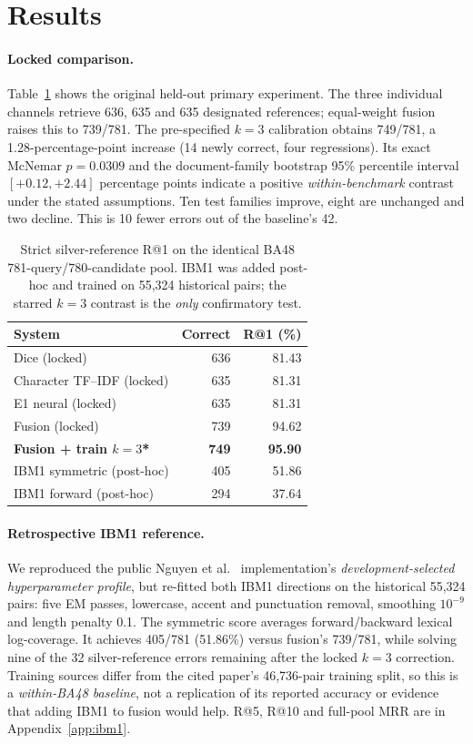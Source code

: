 \section{Results}\label{sec:results}
\paragraph{Locked comparison.} Table~\ref{tab:primary} shows the original held-out primary experiment. The three individual channels retrieve 636, 635 and 635 designated references; equal-weight fusion raises this to 739/781. The pre-specified $k=3$ calibration obtains 749/781, a 1.28-percentage-point increase (14 newly correct, four regressions). Its exact McNemar $p=0.0309$ and the document-family bootstrap 95\% percentile interval $[+0.12,+2.44]$ percentage points indicate a positive \emph{within-benchmark} contrast under the stated assumptions. Ten test families improve, eight are unchanged and two decline. This is 10 fewer errors out of the baseline's 42.

\begin{table}[t]
\centering\small
\caption{Strict silver-reference R@1 on the identical BA48 781-query/780-candidate pool. IBM1 was added post-hoc and trained on 55,324 historical pairs; the starred $k=3$ contrast is the \emph{only} confirmatory test.}
\label{tab:primary}
\begin{tabular}{lrr}
\toprule
System & Correct & R@1 (\%) \\
\midrule
Dice (locked) & 636 & 81.43 \\
Character TF--IDF (locked) & 635 & 81.31 \\
E1 neural (locked) & 635 & 81.31 \\
Fusion (locked) & 739 & 94.62 \\
\textbf{Fusion + train $k=3$*} & \textbf{749} & \textbf{95.90} \\
\midrule
IBM1 symmetric (post-hoc) & 405 & 51.86 \\
IBM1 forward (post-hoc) & 294 & 37.64 \\
\bottomrule
\end{tabular}
\end{table}

\paragraph{Retrospective IBM1 reference.} We reproduced the public Nguyen et al.~\cite{nguyen2026parallelretrieval} implementation's \emph{development-selected hyperparameter profile}, but re-fitted both IBM1 directions on the historical 55,324 pairs: five EM passes, lowercase, accent and punctuation removal, smoothing $10^{-9}$ and length penalty 0.1. The symmetric score averages forward/backward lexical log-coverage. It achieves 405/781 (51.86\%) versus fusion's 739/781, while solving nine of the 32 silver-reference errors remaining after the locked $k=3$ correction. Training sources differ from the cited paper's 46,736-pair training split, so this is a \emph{within-BA48 baseline}, not a replication of its reported accuracy or evidence that adding IBM1 to fusion would help. R@5, R@10 and full-pool MRR are in Appendix~\ref{app:ibm1}.

